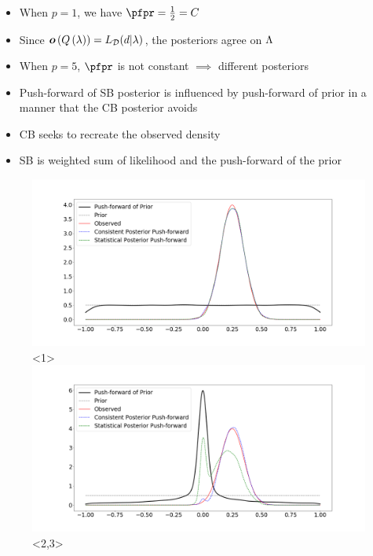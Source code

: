 
\begin{frame}[t]

\begin{itemize}
	\item <1,3> When $p=1$, we have $\pfpr = \frac{1}{2} = C$
	\item <1> Since $\operatorname*{\boldsymbol{o}}\left ( Q\left ( \lambda \right ) \right ) = L_{\mathcal{D}}(d|\lambda)$, the posteriors agree on ${\Lambda}$
	\item <2,3> When $p=5$, $\pfpr$ is not constant $\implies$ different posteriors
	\item <2> Push-forward of SB posterior is influenced by push-forward of prior in a manner that the CB posterior avoids
	\item <3> CB seeks to recreate the observed density
	\item <3> SB is weighted sum of likelihood and the push-forward of the prior
\end{itemize}

\begin{figure}\label{fig:comparison}
		\includegraphics[width=.8\linewidth]{../images/comparison1}<1>
		\includegraphics[width=.8\linewidth]{../images/comparison5}<2,3>
\end{figure}

\end{frame}

